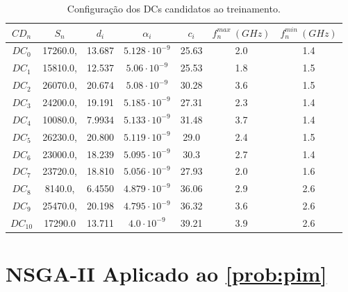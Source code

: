\begin{table}
        \centering
        \begin{tabular}{c|c|c|c|c|c|c}
            $CD_n$      & $S_n$ & $d_i$ &  $\alpha_i$ & $c_i$              & $f_n^{max}\ (GHz)$ & $f_n^{min}\ (GHz)$\\
             \hline
            $ DC_0  $ & 17260.0,  & 13.687    &   $5.128\cdot 10^{-9} $ &      25.63      & 2.0                &  1.4  \\
            $ DC_1$   & 15810.0, &  12.537    &   $5.06\cdot 10^{-9}  $ &      25.53      & 1.8                &  1.5  \\
            $ DC_2$   & 26070.0, &  20.674    &   $5.08\cdot 10^{-9}  $ &      30.28      & 3.6                &  1.5  \\
            $ DC_3 $  &  24200.0, & 19.191	 &   $5.185\cdot 10^{-9} $ &      27.31      & 2.3                &  1.4  \\
            $ DC_4  $ &  10080.0, & 7.9934    &   $5.133\cdot 10^{-9} $ &      31.48      & 3.7                &  1.4  \\
            $ DC_5 $  & 26230.0, &  20.800    &  $ 5.119\cdot 10^{-9}$  &      29.0      & 2.4                &  1.5  \\
            $ DC_6 $  & 23000.0, &  18.239    &  $ 5.095\cdot 10^{-9}$  &      30.3      & 2.7                &  1.4  \\
            $ DC_7 $   & 23720.0, &  18.810    &  $ 5.056\cdot 10^{-9}$  &      27.93      & 2.0                &  1.6  \\
            $ DC_8  $ & 8140.0, &  6.4550    &  $ 4.879\cdot 10^{-9}$  &      36.06      & 2.9                &  2.6  \\
            $ DC_9 $   & 25470.0, & 20.198    &   $4.795\cdot 10^{-9} $ &      36.32      & 3.6                &  2.6  \\
            $ DC_{10}$  & 17290.0 &  13.711    &  $4.0 \cdot 10^{-9} $  &      39.21      & 3.9                 &  2.6  \\
            \hline
        \end{tabular}
        \caption{Configuração dos DCs candidatos ao treinamento.}
        \label{tab:sta_config}
    \end{table}


\section{NSGA-II Aplicado ao \ref{prob:pim}}
\label{sec:aplicacao_nsga2}

